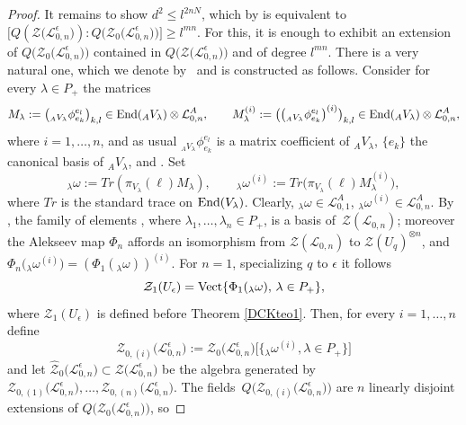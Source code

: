 \documentclass[pdftex]{sigma}
\numberwithin{equation}{section}
\theoremstyle{definition}
\newcommand{\e}{\epsilon}
\newcommand{\Ll}{{\mathcal L}}
\begin{document}
\begin{proof}
It remains to show $d^2\leq l^{2nN}$, which by \smash{$\bigl[Q\bigl(\Ll_{0,n}^\e\bigr):Q\bigl(\mathcal{Z}_0\bigl(\Ll_{0,n}^\e\bigr)\bigr)\bigr]= l^{n(2N+m)}$} is equivalent to~${\bigl[Q(\mathcal{Z}\bigl(\Ll_{0,n}^\e\bigr)):Q\bigl(\mathcal{Z}_0\bigl(\Ll_{0,n}^\e\bigr)\bigr)\bigr] \geq l^{mn}}$. For this, it is enough to exhibit an extension of $Q\bigl(\mathcal{Z}_0\bigl(\Ll_{0,n}^\e\bigr)\bigr)$ contained in $Q\bigl(\mathcal{Z}\bigl(\Ll_{0,n}^\e\bigr)\bigr)$ and of degree $l^{mn}$. There is a very natural one, which we denote by~\smash{$Q\big(\hat{\mathcal{Z}}_{0}\bigl(\Ll_{0,n}^\e\bigr)\big)$} and is constructed as follows. Consider for every $\lambda\in P_+$ the matrices
\[
M_\lambda:=\bigl({}_{{}_AV_{\lambda}}\phi_{e_k}^{e_l}\bigr)_{k,l}\in {\rm End}({}_AV_{\lambda})\otimes\Ll_{0,n}^A,\qquad M_\lambda^{(i)}:=\big(\bigl({}_{{}_AV_{\lambda}}\phi_{e_k}^{e_l}\bigr)^{(i)}\big)_{k,l}\in {\rm End}({}_AV_{\lambda})\otimes\Ll_{0,n}^A,
\]
where $i=1,\dots,n$, and as usual ${}_{{}_AV_{\lambda}}\phi_{e_k}^{e_l}$ is a matrix coefficient of ${}_AV_{\lambda}$, $\{e_k\}$ the canonical basis of ${}_AV_{\lambda}$, and . Set
\[
{}_{\lambda}\omega := Tr(\pi_{V_{\lambda}}(\ell)M_\lambda),\qquad {}_{\lambda}\omega^{(i)} := Tr\big(\pi_{V_{\lambda}}(\ell)M_\lambda^{(i)}\big),
\]
where $Tr$ is the standard trace on ${\rm End}(V_{\lambda})$. Clearly, ${}_{\lambda}\omega\in \Ll_{0,1}^A$, ${}_{\lambda}\omega^{(i)}\in \Ll_{0,n}^A$. By \cite[Propositions~4.8 and~6.24]{BR}, the family of elements , where $\lambda_1,\dots, \lambda_n\in P_+$, is a basis of~$\mathcal{Z}(\Ll_{0,n})$; moreover the Alekseev map $\Phi_n$ affords an isomorphism from $\mathcal{Z}(\Ll_{0,n})$ to $\mathcal{Z}(U_q)^{\otimes n}$, and $\Phi_n\big({}_{\lambda}\omega^{(i)}\big) = (\Phi_1({}_{\lambda}\omega))^{(i)}$. For $n=1$, specializing $q$ to $\e$ it follows
\begin{equation}\label{Z1omegalambda}
\mathcal{Z}_1(U_\e) = {\rm Vect} \lbrace \Phi_1({}_{\lambda}\omega), \, \lambda\in P_+ \rbrace ,
\end{equation}
where $\mathcal{Z}_1(U_\e)$ is defined before Theorem \ref{DCKteo1}. Then, for every $i=1,\dots,n$ define
\[\mathcal{Z}_{0,(i)}\bigl(\Ll_{0,n}^\e\bigr) := \mathcal{Z}_0\bigl(\Ll_{0,n}^\e\bigr)\big[\big\{{}_{\lambda}\omega^{(i)},\lambda\in P_+\big\}\big]
\]
and let $\hat{\mathcal{Z}}_{0}\bigl(\Ll_{0,n}^\e\bigr)\subset \mathcal{Z}\bigl(\Ll_{0,n}^\e\bigr)$ be the algebra generated by $\mathcal{Z}_{0,(1)}\bigl(\Ll_{0,n}^\e\bigr),\dots,\mathcal{Z}_{0,(n)}\bigl(\Ll_{0,n}^\e\bigr)$. The fields~${Q\bigl(\mathcal{Z}_{0,(i)}\bigl(\Ll_{0,n}^\e\bigr)\bigr)}$ are $n$ linearly disjoint extensions of $Q\bigl(\mathcal{Z}_0\bigl(\Ll_{0,n}^\e\bigr)\bigr)$, so

\end{proof}
\end{document}
